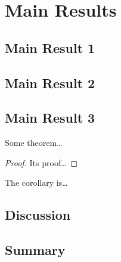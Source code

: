 \chapter{Main Results}
\label{chap.mainresults}

\section{Main Result 1}

\section{Main Result 2}

\section{Main Result 3}

\begin{theorem}
    Some theorem\dots
\end{theorem}

\begin{proof}
    Its proof\dots
\end{proof}


\begin{corollary}
    The corollary is\dots
\end{corollary}

\section{Discussion}

\section{Summary}
